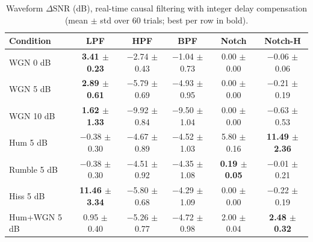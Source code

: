 \begin{table}[!t]
\caption{Waveform $\Delta$SNR (dB), real-time causal filtering with integer delay compensation (mean $\pm$ std over 60 trials; best per row in bold).}
\label{tab:dsnr_causal}
\centering\footnotesize
\begin{tabular}{lccccc}
\hline
Condition & LPF & HPF & BPF & Notch & Notch-H \\ \hline
WGN 0 dB & \textbf{3.41 $\pm$ 0.23} & $-$2.74 $\pm$ 0.43 & $-$1.04 $\pm$ 0.73 & 0.00 $\pm$ 0.00 & $-$0.06 $\pm$ 0.06 \\
WGN 5 dB & \textbf{2.89 $\pm$ 0.61} & $-$5.79 $\pm$ 0.69 & $-$4.93 $\pm$ 0.95 & 0.00 $\pm$ 0.00 & $-$0.21 $\pm$ 0.19 \\
WGN 10 dB & \textbf{1.62 $\pm$ 1.33} & $-$9.92 $\pm$ 0.84 & $-$9.50 $\pm$ 1.04 & 0.00 $\pm$ 0.00 & $-$0.63 $\pm$ 0.53 \\
Hum 5 dB & $-$0.38 $\pm$ 0.30 & $-$4.67 $\pm$ 0.89 & $-$4.52 $\pm$ 1.03 & 5.80 $\pm$ 0.16 & \textbf{11.49 $\pm$ 2.36} \\
Rumble 5 dB & $-$0.38 $\pm$ 0.30 & $-$4.51 $\pm$ 0.92 & $-$4.35 $\pm$ 1.08 & \textbf{0.19 $\pm$ 0.05} & $-$0.01 $\pm$ 0.21 \\
Hiss 5 dB & \textbf{11.46 $\pm$ 3.34} & $-$5.80 $\pm$ 0.68 & $-$4.29 $\pm$ 1.09 & 0.00 $\pm$ 0.00 & $-$0.22 $\pm$ 0.19 \\
Hum+WGN 5 dB & 0.95 $\pm$ 0.40 & $-$5.26 $\pm$ 0.77 & $-$4.72 $\pm$ 0.98 & 2.00 $\pm$ 0.04 & \textbf{2.48 $\pm$ 0.32} \\
\hline
\end{tabular}

\end{table}